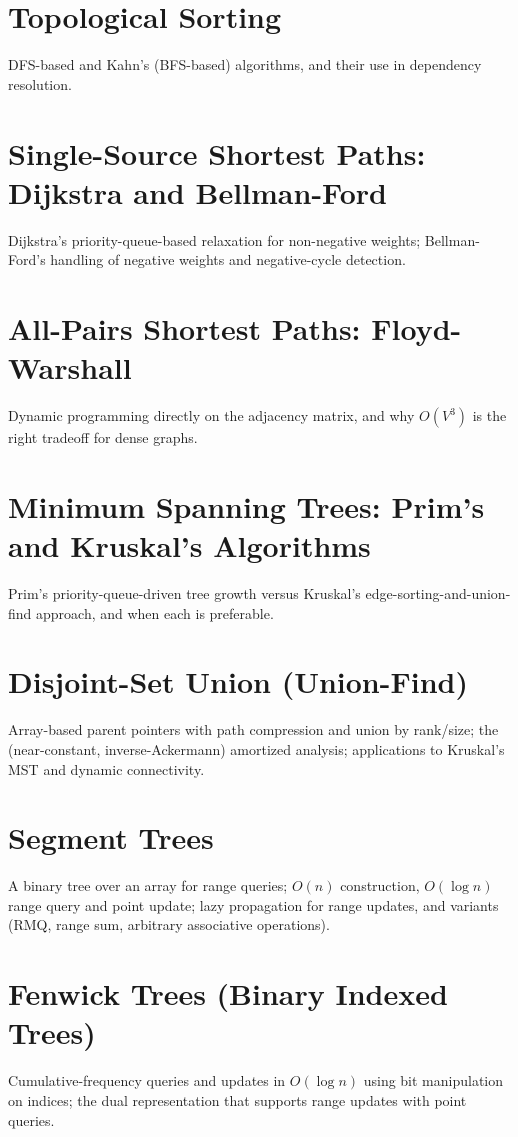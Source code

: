 \chapter{Topological Sorting}
DFS-based and Kahn's (BFS-based) algorithms, and their use in dependency resolution.

\chapter{Single-Source Shortest Paths: Dijkstra and Bellman-Ford}
Dijkstra's priority-queue-based relaxation for non-negative weights; Bellman-Ford's handling of negative weights and negative-cycle detection.

\chapter{All-Pairs Shortest Paths: Floyd-Warshall}
Dynamic programming directly on the adjacency matrix, and why $O(V^3)$ is the right tradeoff for dense graphs.

\chapter{Minimum Spanning Trees: Prim's and Kruskal's Algorithms}
Prim's priority-queue-driven tree growth versus Kruskal's edge-sorting-and-union-find approach, and when each is preferable.

\chapter{Disjoint-Set Union (Union-Find)}
Array-based parent pointers with path compression and union by rank/size; the (near-constant, inverse-Ackermann) amortized analysis; applications to Kruskal's MST and dynamic connectivity.

\chapter{Segment Trees}
A binary tree over an array for range queries; $O(n)$ construction, $O(\log n)$ range query and point update; lazy propagation for range updates, and variants (RMQ, range sum, arbitrary associative operations).

\chapter{Fenwick Trees (Binary Indexed Trees)}
Cumulative-frequency queries and updates in $O(\log n)$ using bit manipulation on indices; the dual representation that supports range updates with point queries.

